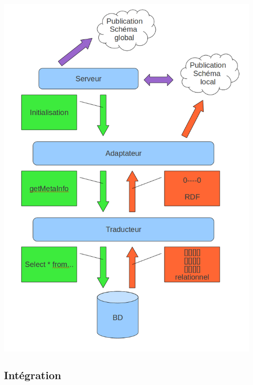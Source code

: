 \documentclass[12pt]{article}
\begin{document}
\begin{center}
	\includegraphics[scale=0.50]{images/initialisationSysteme.png}
\end{center}

\subsection{Intégration}
	
\end{document}
